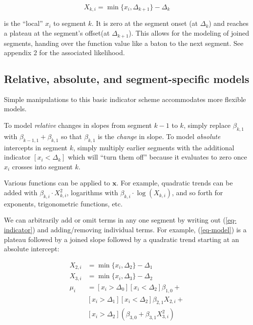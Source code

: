\documentclass[
  american,
]{article}
\begin{document}
\begin{equation}
\label{eq-localx}
X_{k,i} = \min\{x_i, \Delta_{k+1}\} - \Delta_{k}
\end{equation}

is the ``local'' \(x_i\) to segment \(k\). It is zero at the segment onset (at \(\Delta_k\)) and reaches a plateau at the segment's offset(at \(\Delta_{k+1}\)). This allows for the modeling of joined segments, handing over the function value like a baton to the next segment. See appendix 2 for the associated likelihood.

\hypertarget{relative-absolute-and-segment-specific-models}{%
\subsection{Relative, absolute, and segment-specific models}\label{relative-absolute-and-segment-specific-models}}

Simple manipulations to this basic indicator scheme accommodates more flexible models.

To model \emph{relative} changes in slopes from segment \(k-1\) to \(k\), simply replace \(\beta_{k, 1}\) with \(\beta_{k-1, 1} + \beta_{k, 1}\) so that \(\beta_{k, 1}\) is the \emph{change} in slope. To model \emph{absolute} intercepts in segment \(k\), simply multiply earlier segments with the additional indicator \([x_i < \Delta_k]\) which will ``turn them off'' because it evaluates to zero once \(x_i\) crosses into segment \(k\).

Various functions can be applied to \(\mathbf{x}\). For example, quadratic trends can be added with \(\beta_{k, i} \cdot X_{k,i}^2\), logarithms with \(\beta_{k, i} \cdot \log(X_{k,i})\), and so forth for exponents, trigonometric functions, etc.

We can arbitrarily add or omit terms in any one segment by writing out (\ref{eq-indicator}) and adding/removing individual terms. For example, (\ref{eq-model}) is a plateau followed by a joined slope followed by a quadratic trend starting at an absolute intercept:

\begin{equation}
\label{eq-model}
\begin{aligned}
X_{2, i} & = \min\{x_i, \Delta_2\} - \Delta_1 \\
X_{3, i} & = \min\{x_i, \Delta_3\} - \Delta_2 \\
\mu_i & =  [x_i > \Delta_0] [x_i < \Delta_2] \beta_{1, 0} + \\
         & [x_i > \Delta_1] [x_i < \Delta_2] \beta_{2, 1} X_{2, i} + \\
         & [x_i > \Delta_2] (\beta_{3, 0} + \beta_{3, 1} X_{3, i}^2)
\end{aligned}
\end{equation}
\end{document}
